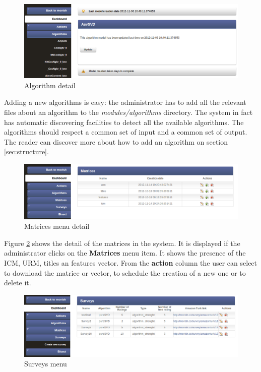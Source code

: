 \begin{figure}
  \centering
  \includegraphics[width=\textwidth]{figures/algorithm_detail.png}
  \caption{Algorithm detail}
  \label{fig:algorithm_detail}
\end{figure}

Adding a new algorithms is easy: the administrator has to add all the relevant files about an algorithm to the \textit{modules/algorithms} directory. The system in fact has automatic discovering facilities to detect all the available algorithms. The algorithms should respect a common set of input and a common set of output. The reader can discover more about how to add an algorithm on section \ref{sec:structure}.

\begin{figure}
  \centering
  \includegraphics[width=\textwidth]{figures/matrices_detail.png}
  \caption{Matrices menu detail}
  \label{fig:matrice_menu}
\end{figure}

Figure \ref{fig:matrice_menu} shows the detail of the matrices in the system. It is displayed if the administrator clicks on the \textbf{Matrices} menu item. It shows the presence of the \ac{ICM}, \ac{URM}, titles an features vector. From the \textbf{action} column the user can select to download the matrice or vector, to schedule the creation of a new one or to delete it.

\begin{figure}
  \centering
  \includegraphics[width=\textwidth]{figures/survey_menu.png}
  \caption{Surveys menu}
  \label{fig:surveys_menu}
\end{figure}

